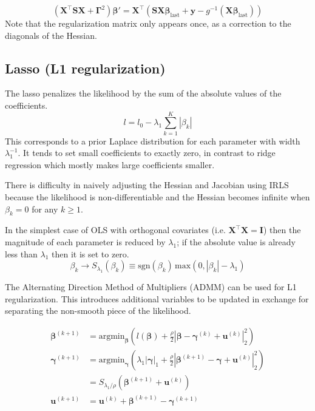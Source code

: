 \documentclass{article}
\newcommand{\bbeta}{\boldsymbol{\beta}}
\begin{document}
\begin{equation}
\left( \mathbf{X}^\intercal \mathbf{S} \mathbf{X} + \boldsymbol{\Gamma}^2 \right)
\bbeta' = \mathbf{X}^\intercal \left( \mathbf{S}
\mathbf{X} \bbeta_\textrm{last} + \mathbf{y} -
g^{-1}(\mathbf{X}\bbeta_\textrm{last}) \right)
\end{equation}
Note that the regularization matrix only appears once, as a correction to the
diagonals of the Hessian.

\subsection{Lasso (L1 regularization)}

The lasso penalizes the likelihood by the sum of the absolute values of the coefficients.
\[ l = l_0 - \lambda_1 \sum_{k=1}^K \left| \beta_{k} \right| \]
This corresponds to a prior Laplace distribution for each parameter with width
\(\lambda_1^{-1}\). It tends to set small coefficients to exactly zero, in
contrast to ridge regression which mostly makes large coefficients smaller.

There is difficulty in naively adjusting the Hessian and Jacobian using IRLS
because the likelihood is non-differentiable and the Hessian becomes infinite
when \(\beta_k = 0\) for any \(k \geq 1\).

In the simplest case of OLS with orthogonal covariates (i.e. \(\mathbf{X}^\intercal \mathbf{X} = \mathbf{I}\)) then the magnitude of each parameter is reduced by \(\lambda_1\); if the absolute value is already less than \(\lambda_1\) then it is set to zero.
\[\beta_k \rightarrow S_{\lambda_1}\left(\beta_k\right) \equiv \textrm{sgn}(\beta_k) \, \textrm{max}\left(0, |\beta_k| - \lambda_1 \right)\]

The Alternating Direction Method of Multipliers (ADMM) can be used for L1
regularization. This introduces additional variables to be updated in exchange
for separating the non-smooth piece of the likelihood.

\begin{align}
\bbeta^{(k+1)} &= \textrm{argmin}_{\bbeta} \left( l(\bbeta) + \frac{\rho}{2}\left| \bbeta - \boldsymbol{\gamma}^{(k)} + \mathbf{u}^{(k)} \right|_2^2 \right) \\
\boldsymbol{\gamma}^{(k+1)} &= \textrm{argmin}_{\boldsymbol{\gamma}} \left( \lambda_1 \left|\boldsymbol{\gamma}\right|_1 + \frac{\rho}{2}\left| \bbeta^{(k+1)} - \boldsymbol{\gamma} + \mathbf{u}^{(k)} \right|_2^2 \right) \\
&= S_{\lambda_1 / \rho} \left( \bbeta^{(k+1)} + \mathbf{u}^{(k)} \right) \\
\mathbf{u}^{(k+1)} &= \mathbf{u}^{(k)} + \bbeta^{(k+1)} - \boldsymbol{\gamma}^{(k+1)}
\end{align}
\end{document}
